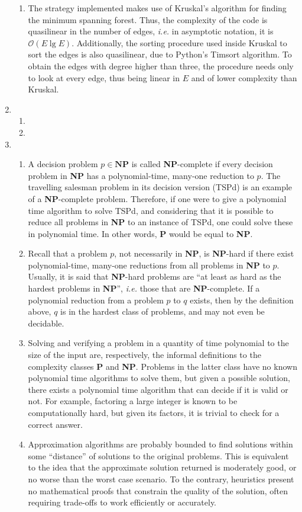 \documentclass[12pt]{article}
\begin{document}
\begin{enumerate}
\begin{enumerate}
    \item The strategy implemented makes use of Kruskal's algorithm for finding the minimum spanning forest. Thus, the complexity of the code is quasilinear in the number of edges, \emph{i.e.} in asymptotic notation, it is $\mathcal{O}(E \lg E)$. Additionally, the sorting procedure used inside Kruskal to sort the edges is also quasilinear, due to Python's Timsort algorithm. To obtain the edges with degree higher than three, the procedure needs only to look at every edge, thus being linear in $E$ and of lower complexity than Kruskal.
  \end{enumerate}
  \item
  \begin{enumerate}
    \item 
    \item 
  \end{enumerate}
  \item 
  \begin{enumerate}
    \item A decision problem $p \in \mathbf{NP}$ is called \textbf{NP}-complete if every decision problem in \textbf{NP} has a polynomial-time, many-one reduction to $p$. The travelling salesman problem in its decision version (TSPd) is an example of a \textbf{NP}-complete problem. Therefore, if one were to give a polynomial time algorithm to solve TSPd, and considering that it is possible to reduce all problems in \textbf{NP} to an instance of TSPd, one could solve these in polynomial time. In other words, \textbf{P} would be equal to \textbf{NP}.
    \item Recall that a problem $p$, not necessarily in \textbf{NP}, is \textbf{NP}-hard if there exist polynomial-time, many-one reductions from all problems in \textbf{NP} to $p$. Usually, it is said that \textbf{NP}-hard problems are ``at least as hard as the hardest problems in \textbf{NP}'', \emph{i.e.} those that are \textbf{NP}-complete. If a polynomial reduction from a problem $p$ to $q  $ exists, then by the definition above, $q$ is in the hardest class of problems, and may not even be decidable.
    \item Solving and verifying a problem in a quantity of time polynomial to the size of the input are, respectively, the informal definitions to the complexity classes \textbf{P} and \textbf{NP}. Problems in the latter class have no known polynomial time algorithms to solve them, but given a possible solution, there exists a polynomial time algorithm that can decide if it is valid or not. For example, factoring a large integer is known to be computationally hard, but given its factors, it is trivial to check for a correct answer.
    \item Approximation algorithms are probably bounded to find solutions within some ``distance'' of solutions to the original problems. This is equivalent to the idea that the approximate solution returned is moderately good, or no worse than the worst case scenario. To the contrary, heuristics present no mathematical proofs that constrain the quality of the solution, often requiring trade-offs to work efficiently or accurately.
  \end{enumerate}
\end{enumerate}
\end{document}
